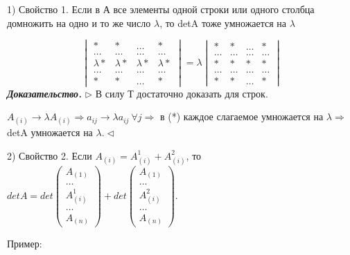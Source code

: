 \vspace{\baselineskip}
1) Свойство 1. Если в А все элементы одной строки или одного столбца домножить на одно и то же число $\lambda$, то detA тоже умножается на $\lambda$

\begin{equation*}
\begin{vmatrix} * & * & \dots & * \\ \dots & \dots & \dots & \dots \\ \lambda * & \lambda * & \lambda * & \lambda * \\ \dots & \dots & \dots & \dots \\ * & * & \dots & * \end{vmatrix} = \lambda \begin{vmatrix} * & * & \dots & * \\ \dots & \dots & \dots & \dots \\  * &  * & * & * \\ \dots & \dots & \dots & \dots \\ * & * & \dots & * \end{vmatrix}
\end{equation*}
\textbf{\textit{Доказательство.}} $\rhd$ В силу Т достаточно доказать для строк. 

$A_{(i)} \rightarrow \lambda A_{(i)} \Rightarrow a_{ij} \rightarrow \lambda a_{ij} \ \forall j \Rightarrow $ в (*) каждое слагаемое умножается на $\lambda \Rightarrow$ detA умножается на $\lambda. \lhd$

\vspace{\baselineskip}
2) Свойство 2. Если $A_{(i)} = A_{(i)}^1 + A_{(i)}^2$, то $detA = det \begin{pmatrix} A_{(1)} \\ \dots \\ A_{(i)}^1 \\ \dots \\ A_{(n)} \end{pmatrix} + det \begin{pmatrix} A_{(1)} \\ \dots \\ A_{(i)}^2 \\ \dots \\ A_{(n)} \end{pmatrix}$.

\vspace{\baselineskip}
Пример:

